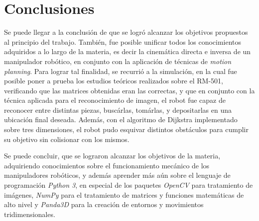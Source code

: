 \section{Conclusiones}
Se puede llegar a la conclusión de que se logró alcanzar los objetivos propuestos al principio del trabajo. También, fue posible unificar todos los conocimientos adquiridos a lo largo de la materia, es decir la cinemática directa e inversa de un manipulador robótico, en conjunto con la aplicación de técnicas de \textit{motion planning}. 
Para lograr tal finalidad, se recurrió a la simulación, en la cual fue posible poner a prueba los estudios teóricos realizados sobre el RM-501, verificando que las matrices obtenidas eran las correctas, y que en conjunto con la técnica aplicada para el reconocimiento de imagen, el robot fue capaz de reconocer entre distintas piezas, buscárlas, tomárlas, y depositarlas en una ubicación final deseada. Además, con el algoritmo de Dijkstra implementado sobre tres dimensiones, el robot pudo esquivar distintos obstáculos para cumplir su objetivo sin colisionar con los mismos.

Se puede concluir, que se lograron alcanzar los objetivos de la materia, adquiriendo conocimientos sobre el funcionamiento mecánico de los manipuladores robóticos, y además aprender más aún sobre el lenguaje de programación \textit{Python 3}, en especial de los paquetes \textit{OpenCV} para tratamiento de imágenes, \textit{NumPy} para el tratamiento de matrices y funciones matemáticas de alto nivel y \textit{Panda3D} para la creación de entornos y movimientos tridimensionales.